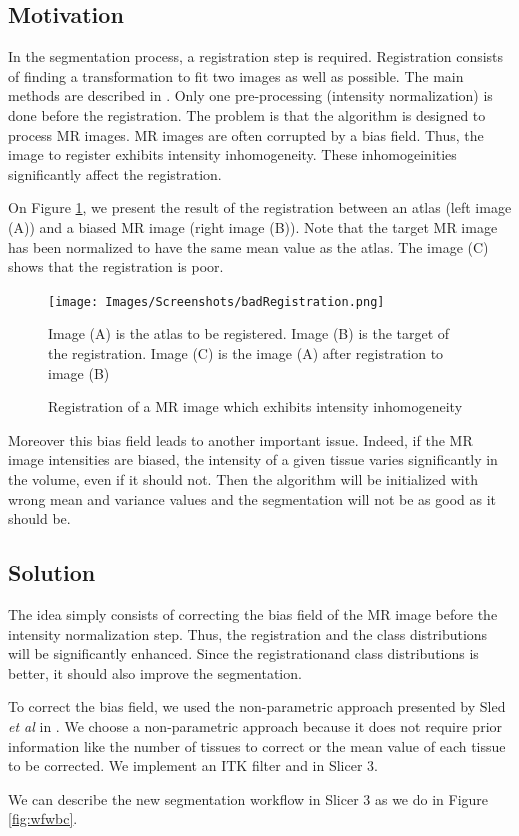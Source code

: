 \subsection{Motivation}

In the segmentation process, a registration step is required. Registration consists of finding a transformation to fit two images as well as possible. The main methods are described in \cite{21}. Only one pre-processing (intensity normalization) is done before the registration. The problem is that the algorithm is designed to process MR images. MR images are often corrupted by a bias field. Thus, the image to register exhibits intensity inhomogeneity. These inhomogeinities significantly affect the registration.
\par
On Figure \ref{fig:bfexemple}, we present the result of the registration between an atlas (left image (A)) and a biased MR image (right image (B)). Note that the target MR image has been normalized to have the same mean value as the atlas. The image (C) shows that the registration is poor.

  \begin{figure}[ht]\centering
  \texttt{[image: Images/Screenshots/badRegistration.png]}
  \caption{Registration of a MR image which exhibits intensity inhomogeneity}{Image (A) is the atlas to be registered. Image (B) is the target of the registration. Image (C) is the image (A) after registration to image (B)}\label{fig:bfexemple}
  \end{figure}
  
\par
Moreover this bias field leads to another important issue. Indeed, if the MR image intensities are biased, the intensity of a given tissue varies significantly  in the volume, even if it should not. Then the algorithm will be initialized with wrong mean and variance values and the segmentation will not be as good as it should be.
  
\subsection{Solution}

The idea simply consists of correcting the bias field of the MR image before the intensity normalization step. Thus, the registration and the class distributions will be significantly enhanced. Since the registrationand class distributions is better, it should also improve the segmentation.
\par
To correct the bias field, we used the non-parametric approach presented by Sled \textit{et al} in \cite{19}. We choose a non-parametric approach because it does not require prior information like the number of tissues to correct or the mean value of each tissue to be corrected. We implement an ITK filter \cite{13} and \cite{14} in Slicer 3. 
\par
We can describe the new segmentation workflow in Slicer 3 as we do in Figure \ref{fig:wfwbc}.

